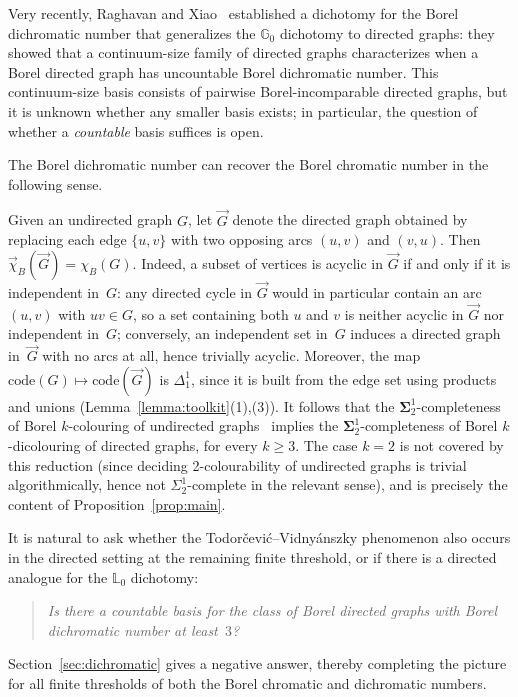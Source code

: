 Very recently, Raghavan and Xiao~\cite{RaghavanXiao2024} established a dichotomy for the Borel dichromatic number that generalizes the $\mathbb{G}_0$ dichotomy to directed graphs: they showed that a continuum-size family of directed graphs characterizes when a Borel directed graph has uncountable Borel dichromatic number.
This continuum-size basis consists of pairwise Borel-incomparable directed graphs, but it is unknown whether any smaller basis exists; in particular, the question of whether a \emph{countable} basis suffices is open.

The Borel dichromatic number can recover the Borel chromatic number in the following sense.

\begin{remark}\label{rmk:dichrom-recovers-chrom}
	Given an undirected graph $G$, let $\vec{G}$ denote the directed graph obtained by replacing each edge $\{u,v\}$ with two opposing arcs $(u,v)$ and $(v,u)$.
	Then $\vec\chi_B(\vec{G}) = \chi_B(G)$.
	Indeed, a subset of vertices is acyclic in $\vec{G}$ if and only if it is independent in~$G$: any directed cycle in $\vec{G}$ would in particular contain an arc $(u,v)$ with $uv\in G$, so a set containing both $u$ and $v$ is neither acyclic in $\vec{G}$ nor independent in~$G$; conversely, an independent set in~$G$ induces a directed graph in~$\vec{G}$ with no arcs at all, hence trivially acyclic.
	Moreover, the map $\mathrm{code}(G)\mapsto\mathrm{code}(\vec{G})$ is $\Delta^1_1$, since it is built from the edge set using products and unions (Lemma~\ref{lemma:toolkit}(1),(3)).
	It follows that the $\mathbf\Sigma^1_2$-completeness of Borel $k$-colouring of undirected graphs~\cite{Todorcevic_2021_ComplexProbBorel} implies the $\mathbf\Sigma^1_2$-completeness of Borel $k$-dicolouring of directed graphs, for every $k\geq 3$.
	The case $k=2$ is not covered by this reduction (since deciding 2-colourability of undirected graphs is trivial algorithmically, hence not $\Sigma^1_2$-complete in the relevant sense), and is precisely the content of Proposition~\ref{prop:main}.
\end{remark}

It is natural to ask whether the Todor{\v{c}}evi{\'c}--Vidny{\'{a}}nszky phenomenon also occurs in the directed setting at the remaining finite threshold, or if there is a directed analogue for the $\mathbb{L}_0$ dichotomy:

\begin{quote}
\emph{Is there a countable basis for the class of Borel directed graphs with Borel dichromatic number at least~$3$?}
\end{quote}

Section~\ref{sec:dichromatic} gives a negative answer, thereby completing the picture for all finite thresholds of both the Borel chromatic and dichromatic numbers.